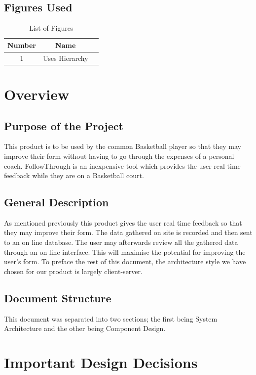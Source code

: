 \newpage
\subsection{Figures Used}
\begin{table}[h!]
  \centering
  \caption{List of Figures}
  \label{tab:table4}
  \begin{tabular}{ccc}
    \toprule
    Number & Name\\
    \midrule
    1 & Uses Hierarchy\\
    \bottomrule
  \end{tabular}
\end{table}

\section{Overview}

\subsection{Purpose of the Project}
This product is to be used by the common Basketball player so that they may improve their form without having to go through the expenses of a personal coach. FollowThrough is an inexpensive tool which provides the user real time feedback while they are on a Basketball court.

\subsection{General Description}
As mentioned previously this product gives the user real time feedback so that they may improve their form. The data gathered on site is recorded and then sent to an on line database. The user may afterwards review all the gathered data through an on line interface. This will maximise the potential for improving the user's form. To preface the rest of this document, the architecture style we have chosen for our product is largely client-server.

\subsection{Document Structure}
This document was separated into two sections; the first being System Architecture and the other being Component Design.

\section{Important Design Decisions}

